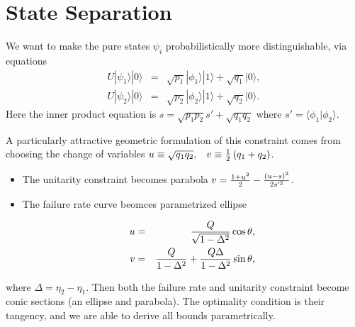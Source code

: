 \documentclass{beamer}
\newcommand{\ke}[1]{|#1\rangle}
\newcommand{\bk}[2]{\langle #1|#2\rangle}
\begin{document}
\section{State Separation}
\begin{frame}
We want to make the pure states $\psi_i$ probabilistically more distinguishable, via
equations
\begin{eqnarray*}
U|\psi_{1}\rangle|0\rangle & = & \sqrt{p_{1}}|\phi_{1}\rangle|1\rangle+\sqrt{q_{1}}\ke 0,\nonumber \\
U|\psi_{2}\rangle|0\rangle & = & \sqrt{p_{2}}|\phi_{2}\rangle|1\rangle+\sqrt{q_{2}}\ke 0.
\end{eqnarray*}
Here the inner product equation is $s = \sqrt{p_1 p_2} s' + \sqrt{q_1 q_2}$ where $s' = \bk{\phi_1}{\phi_2}$.

\end{frame}
\begin{frame}
A particularly attractive geometric formulation of this constraint comes from
choosing the change of variables 
$u\equiv\sqrt{q_{1}q_{2}},\hspace{0.3cm}v\equiv\frac{1}{2}\left(q_{1}+q_{2}\right)$.
\begin{itemize}
\item
The unitarity constraint becomes parabola $v={1+u^2\over2}-{(u-s)^2\over2s'^2}$.
\item
The failure rate curve beomces parametrized ellipse

\begin{eqnarray}
u&=&{Q\over\sqrt{1-\Delta^2}}\cos\theta,\nonumber\\
v&=&{Q\over1-\Delta^2}+{Q\Delta\over1-\Delta^2}\sin\theta,
\end{eqnarray}
\end{itemize}
where $\Delta = \eta_2 - \eta_1$.
Then both the failure rate and unitarity constraint become conic sections (an ellipse and parabola).  The optimality
condition is their tangency, and we are able to derive all bounds parametrically.
\end{frame}
\end{document}
